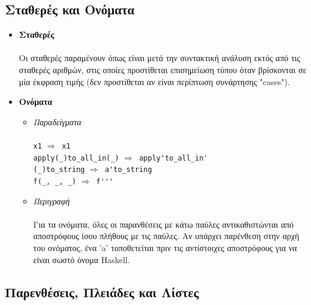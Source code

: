 \documentclass[diploma]{softlab-thesis}
\def\H{Haskell}
\def\lra{$\Longrightarrow$\ }
\begin{document}
\subsection{Σταθερές και Ονόματα}

\begin{itemize}
\item
\textbf{Σταθερές}\\\\
Οι σταθερές παραμένουν όπως είναι μετά την συντακτική ανάλυση εκτός από τις
σταθερές αριθμών, στις οποίες προστίθεται επισημείωση τύπου όταν βρίσκονται σε
μία έκφραση τιμής (δεν προστίθεται αν είναι περίπτωση συνάρτησης "cases").

\item
\textbf{Ονόματα}

\begin{itemize}
\item
\textit{Παραδείγματα}\\\\
\texttt{x1} \lra \texttt{x1} \\
\verb|apply(_)to_all_in(_)| \lra \verb|apply'to_all_in'| \\
\verb|(_)to_string| \lra \verb|a'to_string| \\
\verb|f(_, _, _)| \lra \verb|f'''|\\

\item
\textit{Περιγραφή}\\\\
Για τα ονόματα, όλες οι παρανθέσεις με κάτω παύλες αντικαθιστώνται από
αποστρόφους ίσου πλήθους με τις παύλες. Αν υπάρχει παρένθεση στην αρχή του
ονόματος, ένα 'a' τοποθετείται πριν τις αντίστοιχες αποστρόφους για να
είναι σωστό όνομα \H.

\end{itemize}

\end{itemize}

\subsection{Παρενθέσεις, Πλειάδες και Λίστες}
\end{document}
